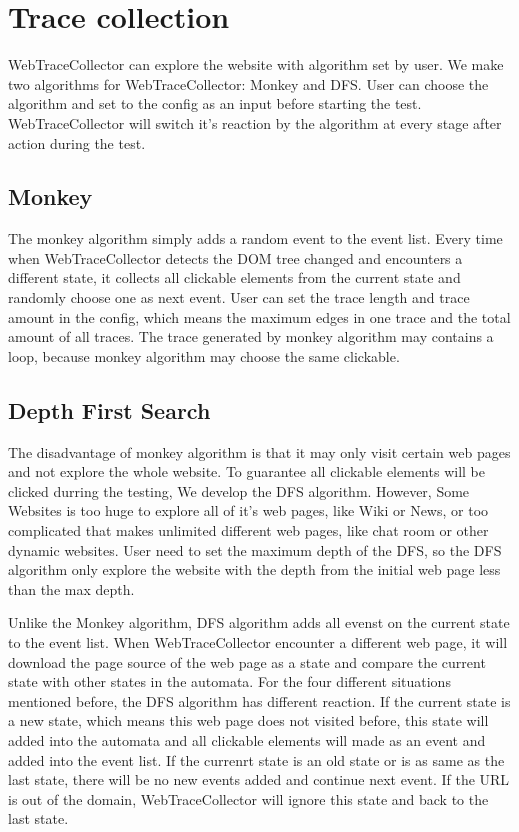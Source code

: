 \clearpage

\section{Trace collection}

WebTraceCollector can explore the website with algorithm set by user.
We make two algorithms for WebTraceCollector: Monkey and DFS.
User can choose the algorithm and set to the config as an input before starting the test.
WebTraceCollector will switch it's reaction by the algorithm at every stage after action during the test.


\subsection{Monkey}

The monkey algorithm simply adds a random event to the event list.
Every time when WebTraceCollector detects the DOM tree changed and encounters a different state,
it collects all clickable elements from the current state and randomly choose one as next event.
User can set the trace length and trace amount in the config,
which means the maximum edges in one trace and the total amount of all traces.
The trace generated by monkey algorithm may contains a loop, 
because monkey algorithm may choose the same clickable.


\subsection{Depth First Search}

The disadvantage of monkey algorithm is that it may only visit certain web pages and not explore the whole website.
To guarantee all clickable elements will be clicked durring the testing,
We develop the DFS algorithm.
However, Some Websites is too huge to explore all of it's web pages, like Wiki or News,
or too complicated that makes unlimited different web pages, like chat room or other dynamic websites. 
User need to set the maximum depth of the DFS,
so the DFS algorithm only explore the website with the depth from the initial web page less than the max depth.

Unlike the Monkey algorithm, DFS algorithm adds all evenst on the current state to the event list.
When WebTraceCollector encounter a different web page,
it will download the page source of the web page as a state and compare the current state with other states in the automata.
For the four different situations mentioned before,
the DFS algorithm has different reaction.
If the current state is a new state, which means this web page does not visited before,
this state will added into the automata and all clickable elements will made as an event and added into the event list.
If the currenrt state is an old state or is as same as the last state,
there will be no new events added and continue next event.
If the URL is out of the domain, WebTraceCollector will ignore this state and back to the last state.

\clearpage

